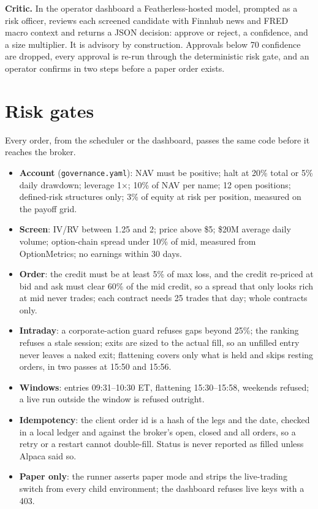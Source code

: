 \documentclass[10pt,a4paper,twocolumn]{article}
\begin{document}
\textbf{Critic.} In the operator dashboard a Featherless-hosted model, prompted as a risk officer, reviews each screened
candidate with Finnhub news and FRED macro context and returns a JSON decision: approve or reject, a confidence, and a
size multiplier. It is advisory by construction. Approvals below 70 confidence are dropped, every approval is re-run
through the deterministic risk gate, and an operator confirms in two steps before a paper order exists.

\section{Risk gates}

Every order, from the scheduler or the dashboard, passes the same code before it reaches the broker.

\begin{itemize}
  \item \textbf{Account} (\texttt{governance.yaml}): NAV must be positive; halt at 20\% total or 5\% daily drawdown;
        leverage 1$\times$; 10\% of NAV per name; 12 open positions; defined-risk structures only; 3\% of equity at
        risk per position, measured on the payoff grid.
  \item \textbf{Screen}: IV/RV between 1.25 and 2; price above \$5; \$20M average daily volume; option-chain spread
        under 10\% of mid, measured from OptionMetrics; no earnings within 30 days.
  \item \textbf{Order}: the credit must be at least 5\% of max loss, and the credit re-priced at bid and ask must clear
        60\% of the mid credit, so a spread that only looks rich at mid never trades; each contract needs 25 trades that
        day; whole contracts only.
  \item \textbf{Intraday}: a corporate-action guard refuses gaps beyond 25\%; the ranking refuses a stale session;
        exits are sized to the actual fill, so an unfilled entry never leaves a naked exit; flattening covers only what
        is held and skips resting orders, in two passes at 15:50 and 15:56.
  \item \textbf{Windows}: entries 09:31--10:30 ET, flattening 15:30--15:58, weekends refused; a live run outside the
        window is refused outright.
  \item \textbf{Idempotency}: the client order id is a hash of the legs and the date, checked in a local ledger and
        against the broker's open, closed and all orders, so a retry or a restart cannot double-fill. Status is never
        reported as filled unless Alpaca said so.
  \item \textbf{Paper only}: the runner asserts paper mode and strips the live-trading switch from every child
        environment; the dashboard refuses live keys with a 403.
\end{itemize}
\end{document}
